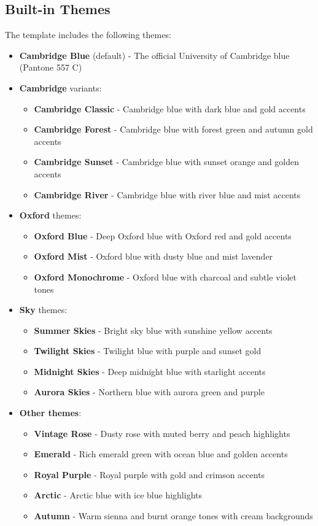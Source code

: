 \documentclass[a4paper,11pt]{article}
\begin{document}
\subsection{Built-in Themes}
The template includes the following themes:
\begin{itemize}
    \item \textbf{Cambridge Blue} (default) - The official University of Cambridge blue (Pantone 557 C)
    \item \textbf{Cambridge} variants:
    \begin{itemize}
        \item \textbf{Cambridge Classic} - Cambridge blue with dark blue and gold accents
        \item \textbf{Cambridge Forest} - Cambridge blue with forest green and autumn gold accents
        \item \textbf{Cambridge Sunset} - Cambridge blue with sunset orange and golden accents
        \item \textbf{Cambridge River} - Cambridge blue with river blue and mist accents
    \end{itemize}
    \item \textbf{Oxford} themes:
    \begin{itemize}
        \item \textbf{Oxford Blue} - Deep Oxford blue with Oxford red and gold accents
        \item \textbf{Oxford Mist} - Oxford blue with dusty blue and mist lavender
        \item \textbf{Oxford Monochrome} - Oxford blue with charcoal and subtle violet tones
    \end{itemize}
    \item \textbf{Sky} themes:
    \begin{itemize}
        \item \textbf{Summer Skies} - Bright sky blue with sunshine yellow accents
        \item \textbf{Twilight Skies} - Twilight blue with purple and sunset gold
        \item \textbf{Midnight Skies} - Deep midnight blue with starlight accents
        \item \textbf{Aurora Skies} - Northern blue with aurora green and purple
    \end{itemize}
    \item \textbf{Other themes}:
    \begin{itemize}
        \item \textbf{Vintage Rose} - Dusty rose with muted berry and peach highlights
        \item \textbf{Emerald} - Rich emerald green with ocean blue and golden accents
        \item \textbf{Royal Purple} - Royal purple with gold and crimson accents
        \item \textbf{Arctic} - Arctic blue with ice blue highlights
        \item \textbf{Autumn} - Warm sienna and burnt orange tones with cream backgrounds
    \end{itemize}
\end{itemize}
\end{document}
